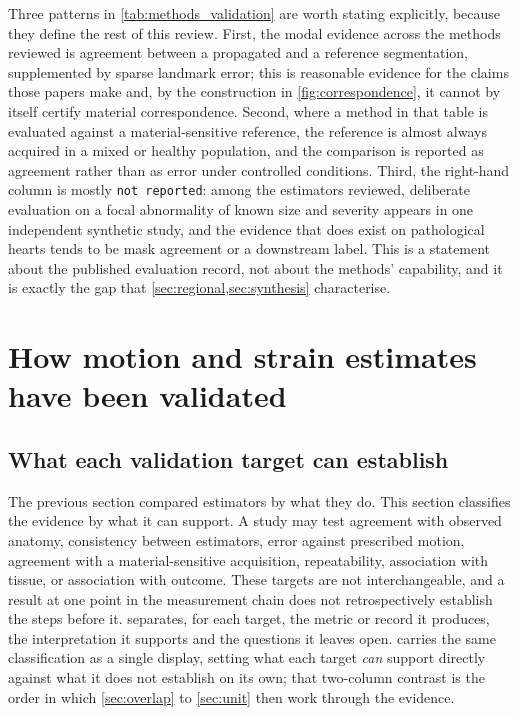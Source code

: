 Three patterns in \cref{tab:methods_validation} are worth stating explicitly, because they define the
rest of this review. First, the modal evidence across the methods reviewed is agreement between a
propagated and a reference segmentation, supplemented by sparse landmark error; this is reasonable
evidence for the claims those papers make and, by the construction in \cref{fig:correspondence}, it
cannot by itself certify material correspondence. Second, where a method in that table is evaluated
against a material-sensitive reference, the reference is almost always acquired in a mixed or
healthy population, and the comparison is reported as agreement rather than as error under controlled
conditions. Third, the right-hand column is mostly \texttt{not reported}: among the estimators
reviewed, deliberate evaluation on a focal abnormality of known size and severity appears in one
independent synthetic study, and the evidence that does exist on pathological hearts tends to be
mask agreement or a downstream label. This is a statement about the published evaluation record, not
about the methods' capability, and it is exactly the gap that \cref{sec:regional,sec:synthesis}
characterise.

\section{How motion and strain estimates have been validated}\label{sec:validation}

\subsection{What each validation target can establish}\label{sec:targets}

The previous section compared estimators by what they do. This section classifies the evidence by
what it can support. A study may test agreement with observed anatomy, consistency between
estimators, error against prescribed motion, agreement with a material-sensitive acquisition,
repeatability, association with tissue, or association with outcome. These targets are not
interchangeable, and a result at one point in the measurement chain does not retrospectively
establish the steps before it.  separates, for each target, the metric or record it
produces, the interpretation it supports and the questions it leaves open.  carries
the same classification as a single display, setting what each target \emph{can} support directly
against what it does not establish on its own; that two-column contrast is the order in which
\cref{sec:overlap} to \cref{sec:unit} then work through the evidence.

